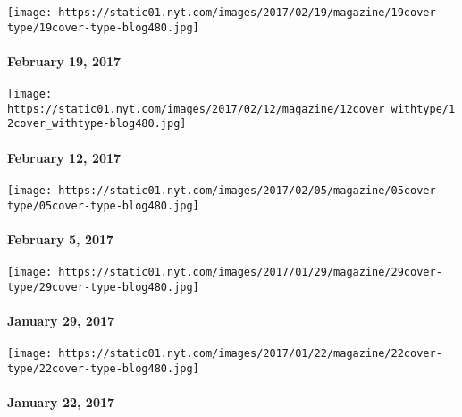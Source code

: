 \href{http://www.nytimes.com/issue/magazine/2017/02/17/the-21917-issue-20170219}{}

\texttt{[image: https://static01.nyt.com/images/2017/02/19/magazine/19cover-type/19cover-type-blog480.jpg]}

\hypertarget{february-19-2017}{%
\paragraph{February 19, 2017}\label{february-19-2017}}

\href{https://www.nytimes.com/issue/magazine/2017/02/10/magazine-index-20170212}{}

\texttt{[image: https://static01.nyt.com/images/2017/02/12/magazine/12cover\_withtype/12cover\_withtype-blog480.jpg]}

\hypertarget{february-12-2017}{%
\paragraph{February 12, 2017}\label{february-12-2017}}

\href{http://www.nytimes.com/issue/magazine/2017/02/05/magazine-index}{}

\texttt{[image: https://static01.nyt.com/images/2017/02/05/magazine/05cover-type/05cover-type-blog480.jpg]}

\hypertarget{february-5-2017}{%
\paragraph{February 5, 2017}\label{february-5-2017}}

\href{http://www.nytimes.com/issue/magazine/2017/01/27/12917-issue-20170129}{}

\texttt{[image: https://static01.nyt.com/images/2017/01/29/magazine/29cover-type/29cover-type-blog480.jpg]}

\hypertarget{january-29-2017}{%
\paragraph{January 29, 2017}\label{january-29-2017}}

\href{http://www.nytimes.com/issue/magazine/2017/01/22/magazine-index}{}

\texttt{[image: https://static01.nyt.com/images/2017/01/22/magazine/22cover-type/22cover-type-blog480.jpg]}

\hypertarget{january-22-2017}{%
\paragraph{January 22, 2017}\label{january-22-2017}}

